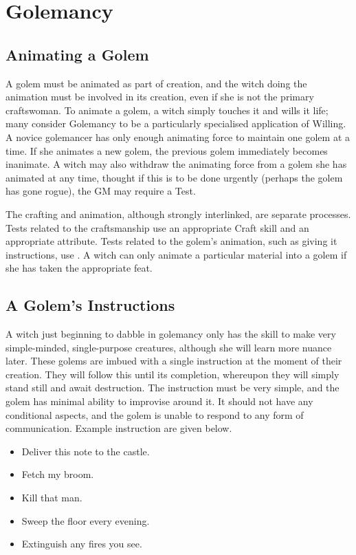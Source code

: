 \chapter{Golemancy}

\section{Animating a Golem}

A golem must be animated as part of creation, and the witch doing the animation must be involved in its creation, even if she is not the primary craftswoman.
To animate a golem, a witch simply touches it and wills it life; many consider Golemancy to be a particularly specialised application of Willing.
A novice golemancer has only enough animating force to maintain one golem at a time.
If she animates a new golem, the previous golem immediately becomes inanimate.
A witch may also withdraw the animating force from a golem she has animated at any time, thought if this is to be done urgently (perhaps the golem has gone rogue), the GM may require a Test.

The crafting and animation, although strongly interlinked, are separate processes.
Tests related to the craftsmanship use an appropriate Craft skill and an appropriate attribute.
Tests related to the golem's animation, such as giving it instructions, use .
A witch can only animate a particular material into a golem if she has taken the appropriate feat.

\section{A Golem's Instructions}

A witch just beginning to dabble in golemancy only has the skill to make very simple-minded, single-purpose creatures, although she will learn more nuance later.
These golems are imbued with a single instruction at the moment of their creation.
They will follow this until its completion, whereupon they will simply stand still and await destruction.
The instruction must be very simple, and the golem has minimal ability to improvise around it.
It should not have any conditional aspects, and the golem is unable to respond to any form of communication.
Example instruction are given below.

\begin{itemize}
	\item Deliver this note to the castle.
	\item Fetch my broom.
	\item Kill that man.
	\item Sweep the floor every evening.
	\item Extinguish any fires you see.
\end{itemize}

